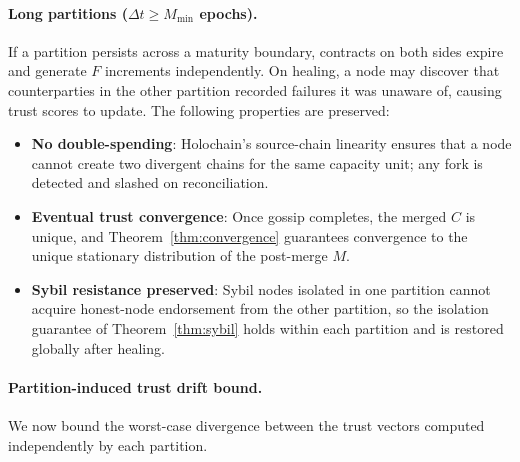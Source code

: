\documentclass[11pt]{article}
\begin{document}
\paragraph{Long partitions ($\Delta t \geq M_{\min}$ epochs).}
If a partition persists across a maturity boundary, contracts on both sides expire and generate $F$ increments independently. On healing, a node may discover that counterparties in the other partition recorded failures it was unaware of, causing trust scores to update. The following properties are preserved:
\begin{itemize}
    \item \textbf{No double-spending}: Holochain's source-chain linearity ensures that a node cannot create two divergent chains for the same capacity unit; any fork is detected and slashed on reconciliation.
    \item \textbf{Eventual trust convergence}: Once gossip completes, the merged $C$ is unique, and Theorem~\ref{thm:convergence} guarantees convergence to the unique stationary distribution of the post-merge $M$.
    \item \textbf{Sybil resistance preserved}: Sybil nodes isolated in one partition cannot acquire honest-node endorsement from the other partition, so the isolation guarantee of Theorem~\ref{thm:sybil} holds within each partition and is restored globally after healing.
\end{itemize}

\paragraph{Partition-induced trust drift bound.}
We now bound the worst-case divergence between the trust vectors computed independently by each partition.
\end{document}
